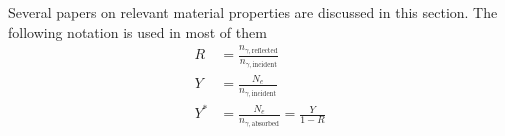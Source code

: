 
Several papers on relevant material properties are discussed in this section.
The following notation is used in most of them
\begin{align}
    R &= \frac{n_{\gamma, \text{reflected}}}{n_{\gamma, \text{incident}}}
    \label{eq:not1}
    \\
    Y &= \frac{N_e}{n_{\gamma, \text{incident}}}
    \\
    Y^* &= \frac{N_e}{n_{\gamma, \text{absorbed}}} = \frac{Y}{1-R}
    \label{eq:yy}
\end{align}

